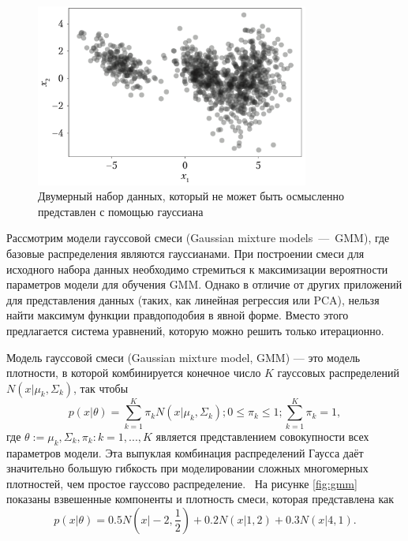 \begin{figure}[H]
	\centering
	\includegraphics[width=0.8\textwidth]{assets/data.png}
	\caption{Двумерный набор данных, который не может быть осмысленно представлен с помощью гауссиана}
	\label{fig:data}
\end{figure}

Рассмотрим модели гауссовой смеси (Gaussian mixture models~---~GMM), где базовые распределения являются гауссианами. При построении смеси для исходного набора данных необходимо стремиться к максимизации вероятности параметров модели для обучения GMM. Однако в отличие от других приложений для представления данных (таких, как линейная регрессия или PCA), нельзя найти максимум функции правдоподобия в явной форме. Вместо этого предлагается система уравнений, которую можно решить только итерационно.~\cite{math}

Модель гауссовой смеси (Gaussian mixture model, GMM) --- это модель плотности, в которой комбинируется конечное число $K$ гауссовых распределений $N(x \vert \mu_k, \Sigma_k)$, так чтобы
\begin{equation}
	p(x \vert \theta) = \sum_{k=1}^{K}\pi_k N(x \vert \mu_k, \Sigma_k); 0 \leq \pi_k \leq 1; \sum_{k=1}^{K}\pi_k = 1,
\end{equation}
где $\theta := {\mu_k, \Sigma_k, \pi_k : k = 1, ..., K}$ является представлением совокупности всех параметров модели. Эта выпуклая комбинация распределений Гаусса даёт значительно большую гибкость при моделировании сложных многомерных плотностей, чем простое гауссово распределение.~\cite{math} На рисунке \ref{fig:gmm} показаны взвешенные компоненты и плотность смеси, которая представлена как
\begin{equation}
	p(x \vert \theta) = 0.5N(x \vert -2, \frac{1}{2}) + 0.2N(x \vert 1, 2) + 0.3N(x \vert 4, 1).
\end{equation}

